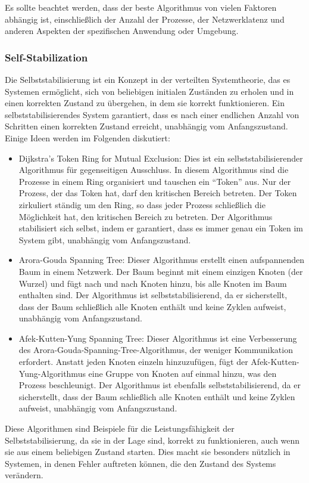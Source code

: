 Es sollte beachtet werden, dass der beste Algorithmus von vielen Faktoren abhängig ist, einschließlich der Anzahl der Prozesse, der Netzwerklatenz und anderen Aspekten der spezifischen Anwendung oder Umgebung.

\subsubsection{Self-Stabilization}
Die Selbststabilisierung ist ein Konzept in der verteilten Systemtheorie, das es Systemen ermöglicht, sich von beliebigen initialen Zuständen zu erholen und in einen korrekten Zustand zu übergehen, in dem sie korrekt funktionieren. Ein selbststabilisierendes System garantiert, dass es nach einer endlichen Anzahl von Schritten einen korrekten Zustand erreicht, unabhängig vom Anfangszustand. Einige Ideen werden im Folgenden diskutiert:
\begin{itemize}
\item Dijkstra's Token Ring for Mutual Exclusion: Dies ist ein selbststabilisierender Algorithmus für gegenseitigen Ausschluss. In diesem Algorithmus sind die Prozesse in einem Ring organisiert und tauschen ein \enquote{Token} aus. Nur der Prozess, der das Token hat, darf den kritischen Bereich betreten. Der Token zirkuliert ständig um den Ring, so dass jeder Prozess schließlich die Möglichkeit hat, den kritischen Bereich zu betreten. Der Algorithmus stabilisiert sich selbst, indem er garantiert, dass es immer genau ein Token im System gibt, unabhängig vom Anfangszustand.
\item Arora-Gouda Spanning Tree: Dieser Algorithmus erstellt einen aufspannenden Baum in einem Netzwerk. Der Baum beginnt mit einem einzigen Knoten (der Wurzel) und fügt nach und nach Knoten hinzu, bis alle Knoten im Baum enthalten sind. Der Algorithmus ist selbststabilisierend, da er sicherstellt, dass der Baum schließlich alle Knoten enthält und keine Zyklen aufweist, unabhängig vom Anfangszustand.
\item Afek-Kutten-Yung Spanning Tree: Dieser Algorithmus ist eine Verbesserung des Arora-Gouda-Spanning-Tree-Algorithmus, der weniger Kommunikation erfordert. Anstatt jeden Knoten einzeln hinzuzufügen, fügt der Afek-Kutten-Yung-Algorithmus eine Gruppe von Knoten auf einmal hinzu, was den Prozess beschleunigt. Der Algorithmus ist ebenfalls selbststabilisierend, da er sicherstellt, dass der Baum schließlich alle Knoten enthält und keine Zyklen aufweist, unabhängig vom Anfangszustand.
\end{itemize}
Diese Algorithmen sind Beispiele für die Leistungsfähigkeit der Selbststabilisierung, da sie in der Lage sind, korrekt zu funktionieren, auch wenn sie aus einem beliebigen Zustand starten. Dies macht sie besonders nützlich in Systemen, in denen Fehler auftreten können, die den Zustand des Systems verändern.

